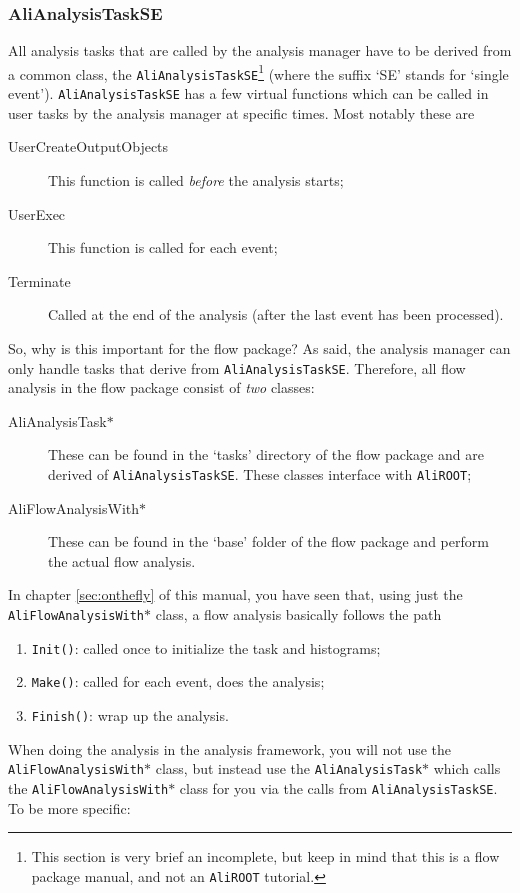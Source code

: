 \documentclass[a4paper]{book}
\numberwithin{equation}{subsection}
\begin{document}
\subsubsection{AliAnalysisTaskSE}
All analysis tasks that are called by the analysis manager have to be derived from a common class, the \texttt{AliAnalysisTaskSE}\footnote{This section is very brief an incomplete, but keep in mind that this is a flow package manual, and not an \texttt{AliROOT} tutorial.} (where the suffix `SE' stands for `single event'). \texttt{AliAnalysisTaskSE} has a few virtual functions which can be called in user tasks by the analysis manager at specific times. Most notably these are
\begin{description}
\item[UserCreateOutputObjects] This function is called \emph{before} the analysis starts;
\item[UserExec] This function is called for each event;
\item[Terminate] Called at the end of the analysis (after the last event has been processed).
\end{description}
So, why is this important for the flow package? As said, the analysis manager can only handle tasks that derive from \texttt{AliAnalysisTaskSE}. Therefore, all flow analysis in the flow package consist of \emph{two} classes:
\begin{description}
\item[AliAnalysisTask$\ast$] These can be found in the `tasks' directory of the flow package and are derived of \texttt{AliAnalysisTaskSE}. These classes interface with \texttt{AliROOT};
\item[AliFlowAnalysisWith$\ast$] These can be found in the `base' folder of the flow package and perform the actual flow analysis.
\end{description}
In chapter \ref{sec:onthefly} of this manual, you have seen that, using just the \texttt{AliFlowAnalysisWith$\ast$} class, a flow analysis basically follows the path
\begin{enumerate}
\item \texttt{Init()}: called once to initialize the task and histograms;
\item \texttt{Make()}: called for each event, does the analysis;
\item \texttt{Finish()}: wrap up the analysis.
\end{enumerate}
When doing the analysis in the analysis framework, you will not use the \texttt{AliFlowAnalysisWith$\ast$} class, but instead use the \texttt{AliAnalysisTask$\ast$} which calls the \texttt{AliFlowAnalysisWith$\ast$} class for you via the calls from \texttt{AliAnalysisTaskSE}. To be more specific:
\end{document}
